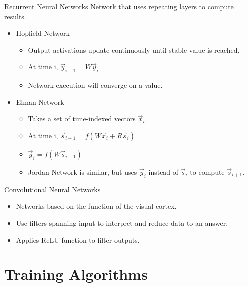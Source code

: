 \documentclass[11pt]{beamer}
\begin{document}
\begin{frame}{Recurrent Neural Networks}
Network that uses repeating layers to compute results.
\begin{itemize}
    \item Hopfield Network
    \begin{itemize}
        \item Output activations update continuously until stable value is reached.
        \item At time i, $\vec{y}_{i+1} = W \vec{y}_i$
        \item Network execution will converge on a value.
    \end{itemize}
    \item Elman Network
    \begin{itemize}
        \item Takes a set of time-indexed vectors $\vec{x}_i$.
        \item At time i, $\vec{s}_{i+1} = f(W\vec{x}_i + R\vec{s}_i)$
        \item $\vec{y}_i = f(W\vec{s}_{i+1})$
        \item Jordan Network is similar, but uses $\vec{y}_i$ instead of $\vec{s}_i$ to compute $\vec{s}_{i+1}$.
    \end{itemize}
\end{itemize}
\end{frame}

\begin{frame}{Convolutional Neural Networks}
\begin{itemize}
    \item Networks based on the function of the visual cortex.
    \item Use filters spanning input to interpret and reduce data to an answer.
    \item Applies ReLU function to filter outputs.
\end{itemize}
\end{frame}

\section{Training Algorithms}
\end{document}
